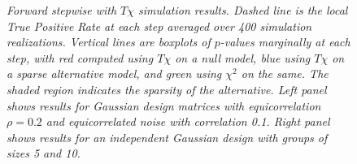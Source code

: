 \documentclass{imsart}
\begin{document}
\begin{figure}[!htp]
\begin{center}
\hspace{-15pt}
\caption{\small \em
Forward stepwise with $T\chi$ simulation results.
Dashed line is the local True Positive Rate at each step averaged over
400 simulation realizations.
Vertical lines
are boxplots of $p$-values marginally at each step, with red computed
using $T\chi$ on a null model, blue using $T\chi$ on a sparse alternative
model, and green using $\chi^2$ on the same. The shaded region indicates
the sparsity of the alternative.
Left panel shows results for Gaussian design
matrices with equicorrelation $\rho=0.2$ and equicorrelated noise with
correlation 0.1. Right panel shows results for an independent
Gaussian design with groups of sizes 5 and 10.}
\label{fig:pval1}
\end{center}
\end{figure}
\end{document}
